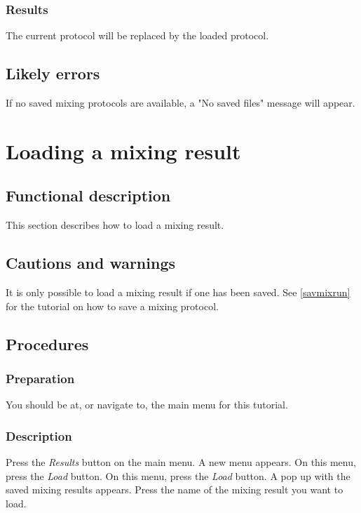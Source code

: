 \subsubsection{Results}
The current protocol will be replaced by the loaded protocol.

\subsection{Likely errors}
If no saved mixing protocols are available, a "No saved files" message will appear. 


\section{Loading a mixing result}
\label{sec:loadMixResult}

\subsection{Functional description}
This section describes how to load a mixing result.

\subsection{Cautions and warnings}
It is only possible to load a mixing result if one has been saved. See \ref{savmixrun} for the tutorial on how to save a mixing protocol.

\subsection{Procedures}
\subsubsection{Preparation}
You should be at, or navigate to, the main menu for this tutorial.

\subsubsection{Description}
Press the \emph{Results} button on the main menu. A new menu appears. On this menu, press the \emph{Load} button. On this menu, press the \emph{Load} button. A pop up with the saved mixing results appears. Press the name of the mixing result you want to load.

